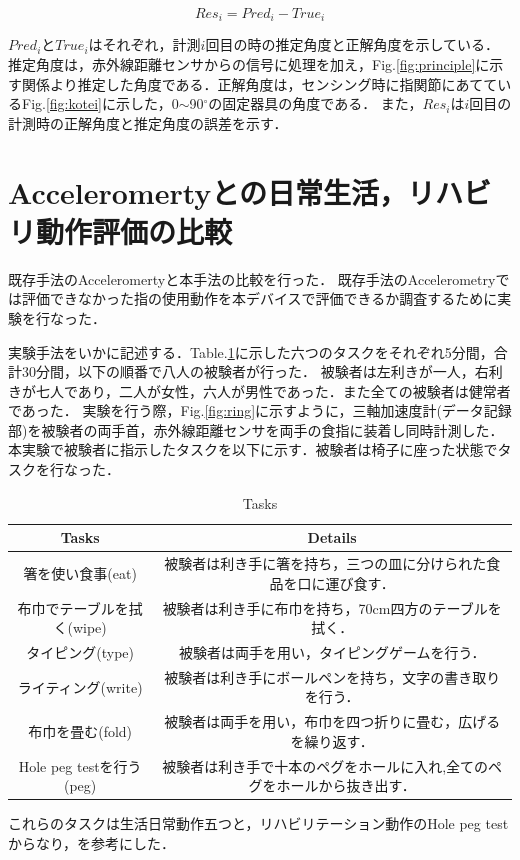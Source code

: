 \begin{equation}
Res_i = Pred_i - True_i
\label{eq:res}
\end{equation}

$Pred_iとTrue_i$はそれぞれ，計測$i$回目の時の推定角度と正解角度を示している．推定角度は，赤外線距離センサからの信号に処理を加え，Fig.\ref{fig:principle}に示す関係より推定した角度である．正解角度は，センシング時に指関節にあてているFig.\ref{fig:kotei}に示した，0$\sim$90$^\circ$の固定器具の角度である．
また，$Res_i$は$i$回目の計測時の正解角度と推定角度の誤差を示す．


\section{Acceleromertyとの日常生活，リハビリ動作評価の比較}
既存手法のAcceleromertyと本手法の比較を行った．
既存手法のAccelerometryでは評価できなかった指の使用動作を本デバイスで評価できるか調査するために実験を行なった．

実験手法をいかに記述する．Table.\ref{table:task}に示した六つのタスクをそれぞれ5分間，合計30分間，以下の順番で八人の被験者が行った．
被験者は左利きが一人，右利きが七人であり，二人が女性，六人が男性であった．また全ての被験者は健常者であった．
実験を行う際，Fig.\ref{fig:ring}に示すように，三軸加速度計(データ記録部)を被験者の両手首，赤外線距離センサを両手の食指に装着し同時計測した．
本実験で被験者に指示したタスクを以下に示す．被験者は椅子に座った状態でタスクを行なった．

\begin{table}[H]
  \caption{Tasks}
    \label{table:task}
  \begin{tabular}{cc}

    \hline 
    Tasks&   Details\\
        \hline \hline
箸を使い食事(eat)&
被験者は利き手に箸を持ち，三つの皿に分けられた食品を口に運び食す．\\

布巾でテーブルを拭く(wipe)&
被験者は利き手に布巾を持ち，70cm四方のテーブルを拭く．\\

タイピング(type)&
被験者は両手を用い，タイピングゲームを行う．\\

ライティング(write)&
被験者は利き手にボールペンを持ち，文字の書き取りを行う．\\

布巾を畳む(fold)&
被験者は両手を用い，布巾を四つ折りに畳む，広げるを繰り返す．\\

Hole peg testを行う(peg)&
被験者は利き手で十本のペグをホールに入れ,全てのペグをホールから抜き出す．\\

    \hline
  \end{tabular}
\end{table}

これらのタスクは生活日常動作五つと，リハビリテーション動作のHole peg testからなり，\cite{Taub2011,Feys2017,Wang2013}を参考にした．


